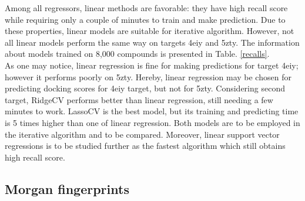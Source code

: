 Among all regressors, linear methods are favorable: they have high recall score while requiring only a couple of minutes to train and make prediction.
Due to these properties, linear models are suitable for iterative algorithm. However, not all linear models perform the same way on targets 4eiy and 5zty. The information about models trained on 8,000 compounds is presented in Table. \ref{recalls}.\\

As one may notice, linear regression is fine for making predictions for target 4eiy; however it performs poorly on 5zty. 
Hereby, linear regression may be chosen for predicting docking scores for 4eiy target, but not for 5zty.
Considering second target, RidgeCV performs better than linear regression, still needing a few minutes to work.
LassoCV is the best model, but its training and predicting time is 5 times higher than one of linear regression.
Both models are to be employed in the iterative algorithm and to be compared.
Moreover, linear support vector regressions is to be studied further as the fastest algorithm which still obtains high recall score.\\



\subsection{Morgan fingerprints}

